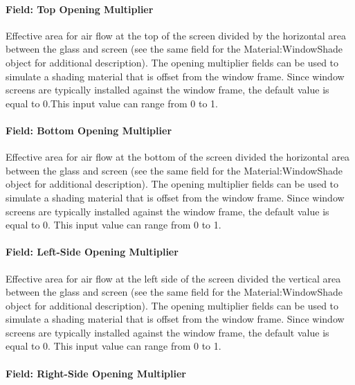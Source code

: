 \paragraph{Field: Top Opening Multiplier}\label{field-top-opening-multiplier-2}

Effective area for air flow at the top of the screen divided by the horizontal area between the glass and screen (see the same field for the Material:WindowShade object for additional description). The opening multiplier fields can be used to simulate a shading material that is offset from the window frame. Since window screens are typically installed against the window frame, the default value is equal to 0.This input value can range from 0 to 1.

\paragraph{Field: Bottom Opening Multiplier}\label{field-bottom-opening-multiplier-2}

Effective area for air flow at the bottom of the screen divided the horizontal area between the glass and screen (see the same field for the Material:WindowShade object for additional description). The opening multiplier fields can be used to simulate a shading material that is offset from the window frame. Since window screens are typically installed against the window frame, the default value is equal to 0. This input value can range from 0 to 1.

\paragraph{Field: Left-Side Opening Multiplier}\label{field-left-side-opening-multiplier-2}

Effective area for air flow at the left side of the screen divided the vertical area between the glass and screen (see the same field for the Material:WindowShade object for additional description). The opening multiplier fields can be used to simulate a shading material that is offset from the window frame. Since window screens are typically installed against the window frame, the default value is equal to 0. This input value can range from 0 to 1.

\paragraph{Field: Right-Side Opening Multiplier}\label{field-right-side-opening-multiplier-2}

